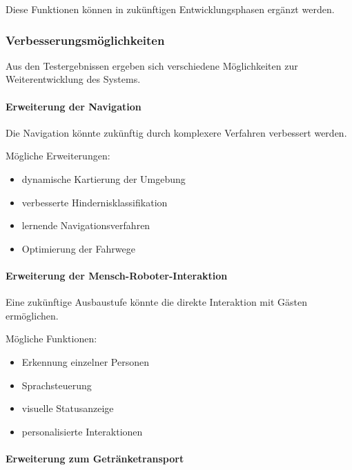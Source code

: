 \documentclass[
  a4paper,
  12pt,
  DIV=12,        %
  parskip=half,  %
  headings=small %
]{scrartcl}
\theoremstyle{definition}
\providecommand{\tightlist}{%
  \setlength{\itemsep}{0pt}\setlength{\parskip}{0pt}}
\theoremstyle{definition}
\begin{document}
Diese Funktionen können in zukünftigen Entwicklungsphasen ergänzt
werden.

\subsubsection{Verbesserungsmöglichkeiten}\label{verbesserungsmuxf6glichkeiten}

Aus den Testergebnissen ergeben sich verschiedene Möglichkeiten zur
Weiterentwicklung des Systems.

\paragraph{Erweiterung der Navigation}\label{erweiterung-der-navigation}

Die Navigation könnte zukünftig durch komplexere Verfahren verbessert
werden.

Mögliche Erweiterungen:

\begin{itemize}
\tightlist
\item
  dynamische Kartierung der Umgebung
\item
  verbesserte Hindernisklassifikation
\item
  lernende Navigationsverfahren
\item
  Optimierung der Fahrwege
\end{itemize}

\paragraph{Erweiterung der
Mensch-Roboter-Interaktion}\label{erweiterung-der-mensch-roboter-interaktion}

Eine zukünftige Ausbaustufe könnte die direkte Interaktion mit Gästen
ermöglichen.

Mögliche Funktionen:

\begin{itemize}
\tightlist
\item
  Erkennung einzelner Personen
\item
  Sprachsteuerung
\item
  visuelle Statusanzeige
\item
  personalisierte Interaktionen
\end{itemize}

\paragraph{Erweiterung zum
Getränketransport}\label{erweiterung-zum-getruxe4nketransport}
\end{document}
